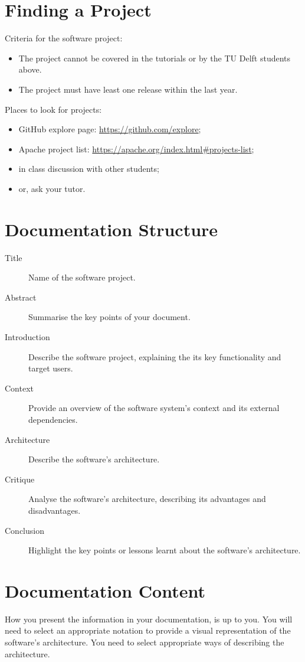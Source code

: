 \documentclass{csse4400}
\begin{document}
\section{Finding a Project}
Criteria for the software project:
\begin{itemize}
    \item The project cannot be covered in the tutorials or by the TU Delft students above.
    \item The project must have least one release within the last year.
\end{itemize}

\noindent Places to look for projects:
\begin{itemize}
    \item GitHub explore page: \url{https://github.com/explore};
    \item Apache project list: \url{https://apache.org/index.html#projects-list};
    \item in class discussion with other students;
    \item or, ask your tutor.
\end{itemize}

\section{Documentation Structure}

\begin{description}
    \item[Title] Name of the software project.
    \item[Abstract] Summarise the key points of your document.
    \item[Introduction] Describe the software project, explaining the its key functionality and target users.
    \item[Context] Provide an overview of the software system's context and its external dependencies.
    \item[Architecture] Describe the software's architecture.
    \item[Critique] Analyse the software's architecture, describing its advantages and disadvantages.
    \item[Conclusion] Highlight the key points or lessons learnt about the software's architecture.
\end{description}

\section{Documentation Content}
How you present the information in your documentation, is up to you. You will need to select an appropriate notation 
to provide a visual representation of the software's architecture. You need to select appropriate ways of describing
the architecture.
\end{document}
